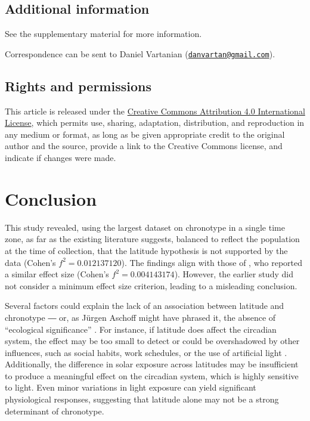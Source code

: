 \documentclass[
12pt,
openright,
oneside,
a4paper,
chapter=TITLE,
section=TITLE,
french,
spanish,
brazil,
english
]{abntex2}\usepackage{array}
\begin{document}
\section{Additional information}\label{additional-information}

See the supplementary material for more information.

Correspondence can be sent to Daniel Vartanian
(\href{mailto:danvartan@gmail.com}{\nolinkurl{danvartan@gmail.com}}).

\section{Rights and permissions}\label{rights-and-permissions}

This article is released under the
\href{http://creativecommons.org/licenses/by/4.0/}{Creative Commons
Attribution 4.0 International License}, which permits use, sharing,
adaptation, distribution, and reproduction in any medium or format, as
long as be given appropriate credit to the original author and the
source, provide a link to the Creative Commons license, and indicate if
changes were made.


\chapter{Conclusion}\label{conclusion}

This study revealed, using the largest dataset on chronotype in a single
time zone, as far as the existing literature suggests, balanced to
reflect the population at the time of collection, that the latitude
hypothesis is not supported by the data (Cohen's \(f^2 = 0.012137120\)).
The findings align with those of \textcite{leocadio-miguel2017}, who
reported a similar effect size (Cohen's \(f^2 = 0.004143174\)). However,
the earlier study did not consider a minimum effect size criterion,
leading to a misleading conclusion.

Several factors could explain the lack of an association between
latitude and chronotype ― or, as Jürgen Aschoff might have phrased it,
the absence of ``ecological significance'' \autocite{aschoff1972}. For
instance, if latitude does affect the circadian system, the effect may
be too small to detect or could be overshadowed by other influences,
such as social habits, work schedules, or the use of artificial light
\autocite{bohlen1973,skeldon2021}. Additionally, the difference in solar
exposure across latitudes may be insufficient to produce a meaningful
effect on the circadian system, which is highly sensitive to light. Even
minor variations in light exposure can yield significant physiological
responses, suggesting that latitude alone may not be a strong
determinant of chronotype.
\end{document}
